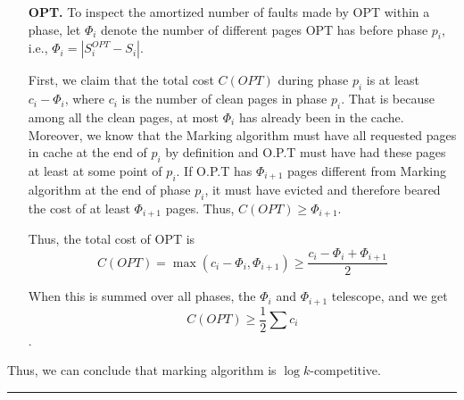\documentclass[11pt]{article}
\newenvironment{proof}{{\bf Proof:  }}{\hfill\rule{2mm}{2mm}}
\begin{document}
\begin{proof}
\begin{enumerate}[itemindent=1em]
		\item [{\bf OPT. }] To inspect the amortized number of faults made by OPT within a phase, let $\Phi_i$ denote the number of different pages OPT has before phase $p_i$, i.e., $\Phi_i=|S_i^{OPT}-S_i|$.
		
		First, we claim that the total cost $C(OPT)$ during phase $p_i$ is at least $c_i-\Phi_i$, where $c_i$ is the number of clean pages in phase $p_i$. That is because among all the clean pages, at most $\Phi_i$ has already been in the cache. Moreover, we know that the Marking algorithm must have all requested pages in cache at the end of $p_i$ by definition and O.P.T must have had these pages at least at some point of $p_i$. If O.P.T has $\Phi_{i+1}$ pages different from Marking algorithm at the end of phase $p_i$, it must have evicted and therefore beared the cost of at least $\Phi_{i+1}$ pages. Thus, $C(OPT)\ge \Phi_{i+1}$.
		
		Thus, the total cost of OPT is
		$$C(OPT)=\max{(c_i-\Phi_i, \Phi_{i+1})}\ge\frac{c_i-\Phi_i+\Phi_{i+1}}{2}$$
		
		When this is summed over all phases, the $\Phi_i$ and $\Phi_{i+1}$ telescope, and we get $$C(OPT)\ge \frac{1}{2}\sum{c_i}$$.
	\end{enumerate}
	Thus, we can conclude that marking algorithm is $\log k$-competitive.
	
	
\end{proof}



\end{document}
